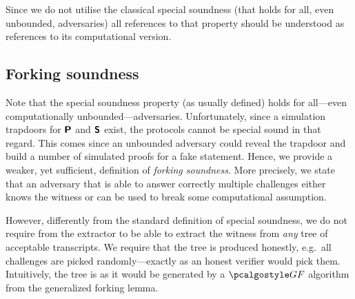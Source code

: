 \documentclass[runningheads,10pt]{llncs}
\begin{document}
Since we do not utilise the classical special soundness (that holds for all,
even unbounded, adversaries) all references to that property should be
understood as references to its computational version.
\fi

\subsection{Forking soundness}
Note that the special soundness property (as usually defined) holds for
all---even computationally unbounded---adversaries. Unfortunately, since a
simulation trapdoors for $\bm{\mathsf{P}}$ and $\bm{\mathsf{S}}$ exist, the protocols
cannot be special sound in that regard. This comes since an unbounded adversary
could reveal the trapdoor and build a number of simulated proofs for a fake
statement. Hence, we provide a weaker, yet sufficient, definition of
\emph{forking soundness}. More precisely, we state that an
adversary that is able to answer correctly multiple challenges either knows the
witness or can be used to break some computational assumption.

However, differently from the standard definition of special soundness, we do
not require from the extractor to be able to extract the witness from \emph{any}
tree of acceptable transcripts. We require that the tree is produced honestly,
e.g.~all challenges are picked randomly---exactly as an honest verifier would
pick them. Intuitively, the tree is as it would be generated by a $\genforking$
algorithm from the generalized forking lemma.

\end{document}
